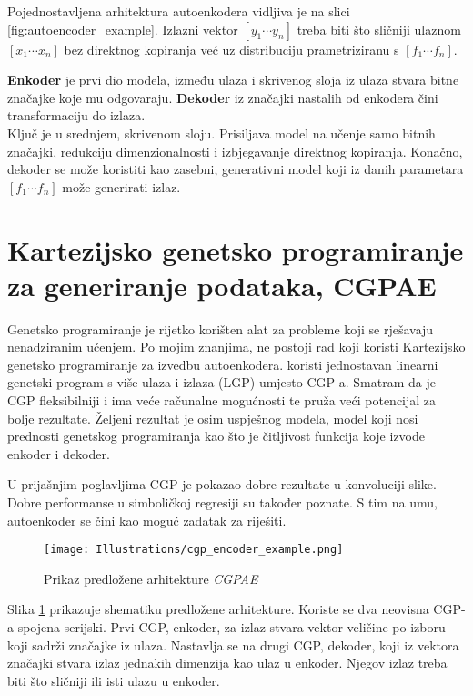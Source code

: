 Pojednostavljena arhitektura autoenkodera vidljiva je na slici \ref{fig:autoencoder_example}.
Izlazni vektor $[y_1 \cdots y_n]$ treba biti što sličniji ulaznom $[x_1 \cdots x_n]$ bez direktnog kopiranja već uz distribuciju prametriziranu s $[f_1 \cdots f_n]$.

\textbf{Enkoder} je prvi dio modela, između ulaza i skrivenog sloja iz ulaza stvara bitne značajke koje mu odgovaraju.
\textbf{Dekoder} iz značajki nastalih od enkodera čini transformaciju do izlaza. \\
Ključ je u srednjem, skrivenom sloju.
Prisiljava model na učenje samo bitnih značajki, redukciju dimenzionalnosti i izbjegavanje direktnog kopiranja.
Konačno, dekoder se može koristiti kao zasebni, generativni model koji iz danih parametara $[f_1 \cdots f_n]$ može generirati izlaz.
\section{Kartezijsko genetsko programiranje za generiranje podataka, CGPAE}
Genetsko programiranje je rijetko korišten alat za probleme koji se rješavaju nenadziranim učenjem.
Po mojim znanjima, ne postoji rad koji koristi Kartezijsko genetsko programiranje za izvedbu autoenkodera.
\cite{why_ae_diff} koristi jednostavan linearni genetski program s više ulaza i izlaza (LGP) umjesto CGP-a.
Smatram da je CGP fleksibilniji i ima veće računalne mogućnosti te pruža veći potencijal za bolje rezultate.
Željeni rezultat je osim uspješnog modela, model koji nosi prednosti genetskog programiranja kao što je čitljivost funkcija koje izvode enkoder i dekoder.

U prijašnjim poglavljima CGP je pokazao dobre rezultate u konvoluciji slike.
Dobre performanse u simboličkoj regresiji su također poznate.
S tim na umu, autoenkoder se čini kao moguć zadatak za riješiti.

\begin{figure}[H]
	\centering
	\texttt{[image: Illustrations/cgp\_encoder\_example.png]}
	\caption{Prikaz predložene arhitekture \emph{CGPAE}}
	\label{fig:cgpae}
\end{figure}

Slika \ref{fig:cgpae} prikazuje shematiku predložene arhitekture.
Koriste se dva neovisna CGP-a spojena serijski.
Prvi CGP, enkoder, za izlaz stvara vektor veličine po izboru koji sadrži značajke iz ulaza.
Nastavlja se na drugi CGP, dekoder, koji iz vektora značajki stvara izlaz jednakih dimenzija kao ulaz u enkoder.
Njegov izlaz treba biti što sličniji ili isti ulazu u enkoder.

